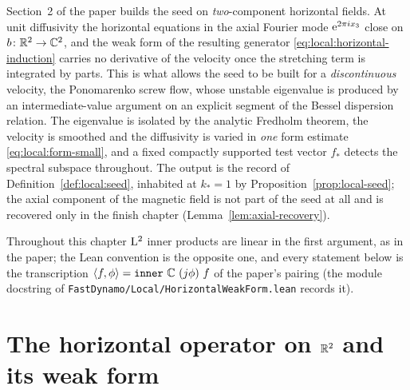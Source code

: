 
Section~2 of the paper builds the seed on \emph{two}-component horizontal fields.  At unit
diffusivity the horizontal equations in the axial Fourier mode $\mathrm{e}^{2\pi ix_3}$ close on
$b\colon\mathbb{R}^2\to\mathbb{C}^2$, and the weak form of the resulting generator
\eqref{eq:local:horizontal-induction} carries no derivative of the velocity once the
stretching term is integrated by parts.  This is what allows the seed to be built for a
\emph{discontinuous} velocity, the Ponomarenko screw flow, whose unstable eigenvalue is
produced by an intermediate-value argument on an explicit segment of the Bessel dispersion
relation.  The eigenvalue is isolated by the analytic Fredholm theorem, the velocity is
smoothed and the diffusivity is varied in \emph{one} form estimate
\eqref{eq:local:form-small}, and a fixed compactly supported test vector $f_*$ detects the
spectral subspace throughout.  The output is the record of Definition~\ref{def:local:seed},
inhabited at $k_*=1$ by Proposition~\ref{prop:local-seed}; the axial component of the
magnetic field is not part of the seed at all and is recovered only in the finish chapter
(Lemma~\ref{lem:axial-recovery}).

Throughout this chapter $\mathrm{L}^2$ inner products are linear in the first argument, as in the
paper; the Lean convention is the opposite one, and every statement below is the
transcription $\inner f\phi=\texttt{inner}\ \CC\ (j\phi)\ f$ of the paper's pairing
(the module docstring of \texttt{FastDynamo/Local/HorizontalWeakForm.lean} records it).

\section{The horizontal operator on $\mathbb{R}^2$ and its weak form}

